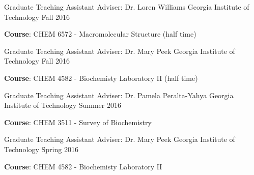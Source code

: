 

\begin{cventries}

  \cventry
    {Graduate Teaching Assistant} %
    {Adviser: Dr. Loren Williams} %
    {Georgia Institute of Technology} %
    {Fall 2016} %
    {
      \begin{cvitems} %
        \item {\textbf{Course}: CHEM 6572 - Macromolecular Structure (half time)}
      \end{cvitems}
    }

  \cventry
    {Graduate Teaching Assistant} %
    {Adviser: Dr. Mary Peek} %
    {Georgia Institute of Technology} %
    {Fall 2016} %
    {
      \begin{cvitems} %
        \item {\textbf{Course}: CHEM 4582 - Biochemisty Laboratory II (half time)}
      \end{cvitems}
    }

  \cventry
    {Graduate Teaching Assistant} %
    {Adviser: Dr. Pamela Peralta-Yahya} %
    {Georgia Institute of Technology} %
    {Summer 2016} %
    {
      \begin{cvitems} %
        \item {\textbf{Course}: CHEM 3511 - Survey of Biochemistry}
      \end{cvitems}
    }

  \cventry
    {Graduate Teaching Assistant} %
    {Adviser: Dr. Mary Peek} %
    {Georgia Institute of Technology} %
    {Spring 2016} %
    {
      \begin{cvitems} %
        \item {\textbf{Course}: CHEM 4582 - Biochemisty Laboratory II}
      \end{cvitems}
    }


\end{cventries}
